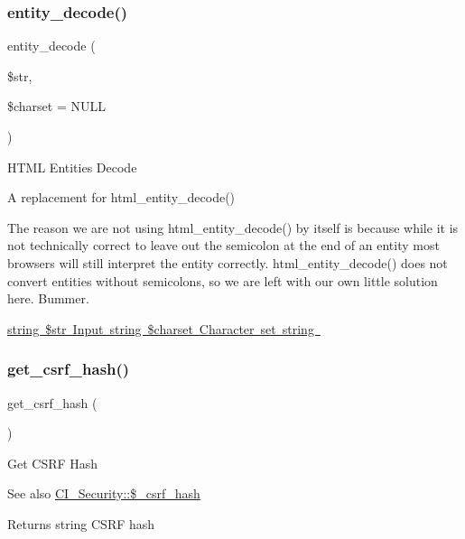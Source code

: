 \subsubsection{\texorpdfstring{entity\+\_\+decode()}{entity\_decode()}}
{\footnotesize\ttfamily entity\+\_\+decode (\begin{DoxyParamCaption}\item[{}]{\$str,  }\item[{}]{\$charset = {\ttfamily NULL} }\end{DoxyParamCaption})}

H\+T\+ML Entities Decode

A replacement for html\+\_\+entity\+\_\+decode()

The reason we are not using html\+\_\+entity\+\_\+decode() by itself is because while it is not technically correct to leave out the semicolon at the end of an entity most browsers will still interpret the entity correctly. html\+\_\+entity\+\_\+decode() does not convert entities without semicolons, so we are left with our own little solution here. Bummer.

\mbox{\hyperlink{}{string \$str Input  string \$charset Character set  string }}\mbox{\label{class_c_i___security_a1644fd8967db3a1b94988d730ca34991}} 
\subsubsection{\texorpdfstring{get\+\_\+csrf\+\_\+hash()}{get\_csrf\_hash()}}
{\footnotesize\ttfamily get\+\_\+csrf\+\_\+hash (\begin{DoxyParamCaption}{ }\end{DoxyParamCaption})}

Get C\+S\+RF Hash

\begin{DoxySeeAlso}{See also}
\mbox{\hyperlink{class_c_i___security_a8bf24cc529f04164ac20d892ce20d721}{C\+I\+\_\+\+Security\+::\$\+\_\+csrf\+\_\+hash}} 
\end{DoxySeeAlso}
\begin{DoxyReturn}{Returns}
string C\+S\+RF hash 
\end{DoxyReturn}
\mbox{\label{class_c_i___security_a00640f51b90b7d946e9d3a4f0c9f628e}} 
